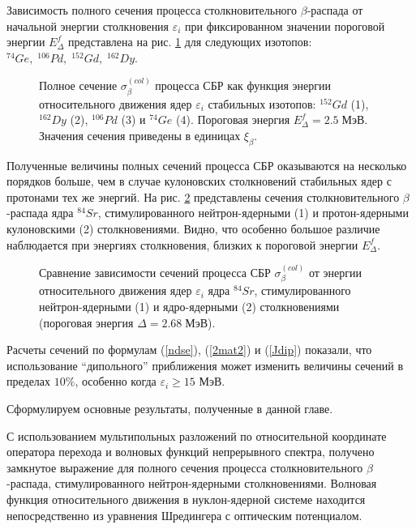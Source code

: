 Зависимость полного сечения процесса столкновительного $\beta$-распада от
начальной энергии столкновения $\varepsilon_i$ при фиксированном значении
пороговой энергии $E^f_\Delta$  представлена на рис. \ref{EF25} для следующих изотопов:
$^{74}Ge, \; ^{106}Pd, \; ^{152}Gd, \; ^{162}Dy$.

\begin{figure}
\vspace{18 true cm}
\caption{{ Полное сечение  $\sigma^{(col)}_\beta$ процесса СБР как функция
 энергии относительного движения ядер $\varepsilon_i$ стабильных изотопов:
$^{152}Gd$ (1), $^{162}Dy$ (2), $^{106}Pd$ (3) и $^{74}Ge$ (4). Пороговая энергия $E^f_\Delta= 2.5 \; МэВ$.
Значения сечения приведены
в единицах $\xi_\beta$.}}
\label{EF25}
\end{figure}



Полученные величины полных сечений процесса СБР оказываются на несколько
порядков больше, чем в случае кулоновских столкновений стабильных ядер с
протонами тех же энергий. На рис. \ref{EF4}  представлены сечения столкновительного
$\beta$-распада ядра $^{84}Sr$,  стимулированного нейтрон-ядерными (1) и
протон-ядерными кулоновскими (2) столкновениями. Видно, что особенно большое различие
наблюдается при энергиях столкновения, близких к пороговой энергии
$E^f_\Delta$.


\begin{figure}
\vspace{18 true cm}
\caption{{ Сравнение зависимости сечений процесса СБР    $\sigma^{(col)}_\beta$ от энергии относительного
движения ядер $\varepsilon_i$ ядра $^{84}Sr$, стимулированного нейтрон-ядерными
 (1) и ядро-ядерными (2)   столкновениями (пороговая энергия $\Delta=2.68\; МэВ$).}}
\label{EF4}
\end{figure}


Расчеты сечений по формулам (\ref{ndse}), (\ref{2mat2}) и (\ref{Jdip})
показали, что использование ``дипольного'' приближения может изменить
величины сечений в пределах  $10 \%$, особенно когда  $\varepsilon_i \geq 15$ МэВ.


Сформулируем основные результаты, полученные в данной главе.


С использованием мультипольных разложений по относительной координате оператора
перехода и волновых функций непрерывного спектра,
получено замкнутое выражение для полного сечения процесса столкновительного
$\beta$-распада, стимулированного нейтрон-ядерными столкновениями.
Волновая функция относительного движения в нуклон-ядерной системе находится
непосредственно из
уравнения Шредингера с оптическим потенциалом.

